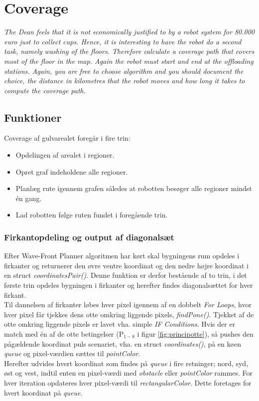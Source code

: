 \section{Coverage}
\label{sec:cov}
\textit{The Dean feels that it is not economically justified to by a robot system for 80.000 euro just to collect cups. Hence, it is interesting to have the robot do a second task, namely washing of the floors. Therefore calculate a coverage path that covers most of the floor in the map. Again the robot must start and end at the offloading stations.
Again, you are free to choose algorithm and you should document the choice, the distance in kilometres that the robot moves and how long it takes to compute the coverage path.}

\subsection{Funktioner}
Coverage af gulvarealet foregår i fire trin:
\begin{itemize}
	\item Opdelingen af arealet i regioner.
	\item Opret graf indeholdene alle regioner.
	\item Planlæg rute igennem grafen således at robotten besøger alle regioner mindst én gang.
	\item Lad robotten følge ruten fundet i foregående trin.
\end{itemize}

\subsubsection{Firkantopdeling og output af diagonalsæt}
Efter Wave-Front Planner algoritmen har kørt skal bygningens rum opdeles i firkanter og returnerer den øvre ventre koordinat og den nedre højre koordinat i en struct \emph{coordinatesPair()}. Denne funktion er derfor bestående af to trin, i det første trin opdeles bygningen i firkanter og herefter findes diagonalsættet for hver firkant.\\
Til dannelsen af firkanter løbes hver pixel igennem af en dobbelt \emph{For Loops}, hvor hver pixel får tjekkes dens otte omkring liggende pixels, \emph{findPone()}. Tjekket af de otte omkring liggende pixels er lavet vha. simple \emph{IF Conditions}. Hvis der er match med én af de otte betingelser (P\(_{1-8}\) i figur \ref{fig:principotte}), så pushes den pågældende koordinat puls scenariet, vha. en struct \emph{coordinates()}, på en køen \emph{queue} og pixel-værdien sættes til \emph{pointColor}.\\
Herefter udvides hvert koordinat som findes på \emph{queue} i fire retninger; nord, syd, øst og vest, indtil enten en pixel-værdi med \emph{obstacle} eller \emph{pointColor} rammes. For hver iteration opdateres hver pixel-værdi til \emph{rectangularColor}. Dette foretages for hvert koordinat på \emph{queue}.\\


